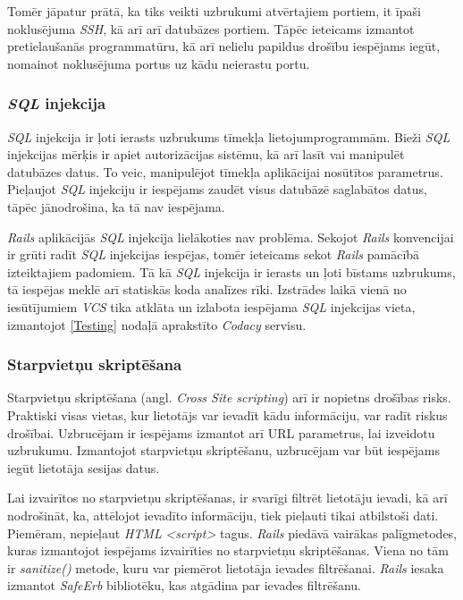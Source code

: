 Tomēr jāpatur prātā, ka tiks veikti uzbrukumi atvērtajiem portiem, it īpaši noklusējuma \textit{SSH}, kā arī arī datubāzes portiem. Tāpēc ieteicams izmantot pretielaušanās programmatūru, kā arī nelielu papildus drošību iespējams iegūt, nomainot noklusējuma portus uz kādu neierastu portu.

\subsubsection{\textit{SQL} injekcija}
\textit{SQL} injekcija ir ļoti ierasts uzbrukums tīmekļa lietojumprogrammām. Bieži \textit{SQL} injekcijas mērķis ir apiet autorizācijas sistēmu, kā arī lasīt vai manipulēt datubāzes datus. To veic, manipulējot tīmekļa aplikācijai nosūtītos parametrus. Pieļaujot \textit{SQL} injekciju ir iespējams zaudēt visus datubāzē saglabātos datus, tāpēc jānodrošina, ka tā nav iespējama.

\textit{Rails} aplikācijās \textit{SQL} injekcija lielākoties nav problēma. Sekojot \textit{Rails} konvencijai ir grūti radīt \textit{SQL} injekcijas iespējas, tomēr ieteicams sekot \textit{Rails} pamācībā \cite{rails-guides} izteiktajiem padomiem. Tā kā \textit{SQL} injekcija ir ierasts un ļoti bīstams uzbrukums, tā iespējas meklē arī statiskās koda analīzes rīki. Izstrādes laikā vienā no iesūtījumiem \textit{VCS} tika atklāta un izlabota iespējama \textit{SQL} injekcijas vieta, izmantojot \ref{Testing} nodaļā aprakstīto \textit{Codacy} servisu.

\subsubsection{Starpvietņu skriptēšana}
Starpvietņu skriptēšana (angl. \textit{Cross Site scripting}) arī ir nopietns drošības risks. Praktiski visas vietas, kur lietotājs var ievadīt kādu informāciju, var radīt riskus drošībai. Uzbrucējam ir iespējams izmantot arī URL parametrus, lai izveidotu uzbrukumu. Izmantojot starpvietņu skriptēšanu, uzbrucējam var būt iespējams iegūt lietotāja sesijas datus.

Lai izvairītos no starpvietņu skriptēšanas, ir svarīgi filtrēt lietotāju ievadi, kā arī nodrošināt, ka, attēlojot ievadīto informāciju, tiek pieļauti tikai atbilstoši dati. Piemēram, nepieļaut \textit{HTML} \textit{<script>} tagus.
\textit{Rails} piedāvā vairākas palīgmetodes, kuras izmantojot iespējams izvairīties no starpvietņu skriptēšanas. Viena no tām ir \textit{sanitize()} metode, kuru var piemērot lietotāja ievades filtrēšanai. \textit{Rails} iesaka izmantot \textit{SafeErb} bibliotēku, kas atgādina par ievades filtrēšanu.

